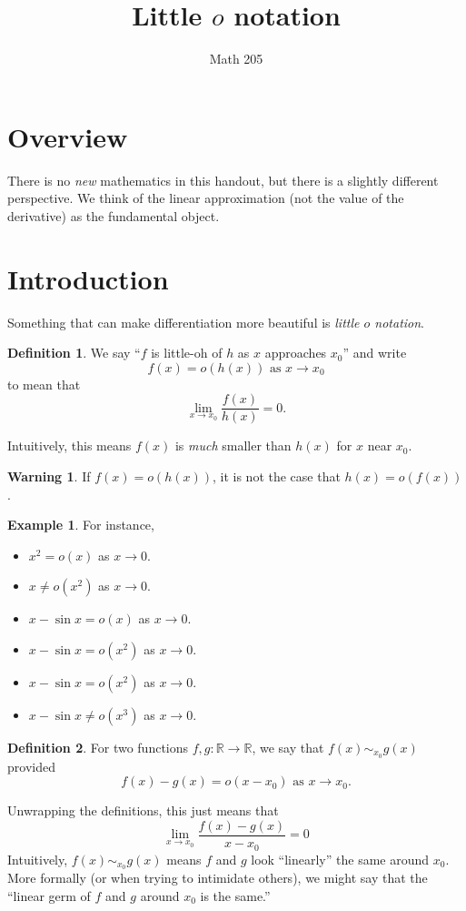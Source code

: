 \documentclass[12pt]{article}
\title{Little $o$ notation}
\author{Math 205}
\date{}
\newcommand{\R}{\mathbb{R}}
\theoremstyle{plain}%
\theoremstyle{definition}
\newtheorem{definition}{Definition}[theorem]
\newtheorem{example}{Example}[theorem]
\newtheorem*{warning}{Warning}
\begin{document}
\maketitle

\section{Overview}

There is no \textit{new} mathematics in this handout, but there is a
slightly different perspective.  We think of the linear approximation
(not the value of the derivative) as the fundamental object.

\section{Introduction}

Something that can make differentiation more beautiful is
\textit{little $o$ notation}.
\begin{definition}
We say ``$f$ is little-oh of $h$ as $x$
approaches $x_0$'' and write
$$
f(x) = o(h(x)) \mbox{ as $x \to x_0$}
$$
to mean that
$$
\lim_{x \to x_0} \frac{f(x)}{h(x)} = 0.
$$
\end{definition}
Intuitively, this means $f(x)$ is \textit{much} smaller than $h(x)$
for $x$ near $x_0$.

\begin{warning}
If $f(x) = o(h(x))$, it is not the case that $h(x) = o(f(x))$.
\end{warning}

\begin{example}
For instance,
\begin{itemize}
\item $x^2 = o(x)$ as $x \to 0$.
\item $x \neq o(x^2)$ as $x \to 0$.
\item $x - \sin x = o(x)$ as $x \to 0$.
\item $x - \sin x = o(x^2)$ as $x \to 0$.
\item $x - \sin x = o(x^2)$ as $x \to 0$.
\item $x - \sin x \neq o(x^3)$ as $x \to 0$.
\end{itemize}
\end{example}

\begin{definition}
For two functions $f, g : \R \to \R$, we say that $f(x) \sim_{x_0} g(x)$ provided
$$
f(x) - g(x) = o(x - x_0) \mbox{ as $x \to x_0$.}
$$
\end{definition}
\noindent
Unwrapping the definitions, this just means that
$$
\lim_{x \to x_0} \frac{f(x) - g(x)}{x - x_0} = 0
$$
Intuitively, $f(x) \sim_{x_0} g(x)$ means $f$ and $g$ look
``linearly'' the same around $x_0$.  More formally (or when trying to
intimidate others), we might say that the ``linear germ of $f$ and $g$
around $x_0$ is the same.''
\end{document}
